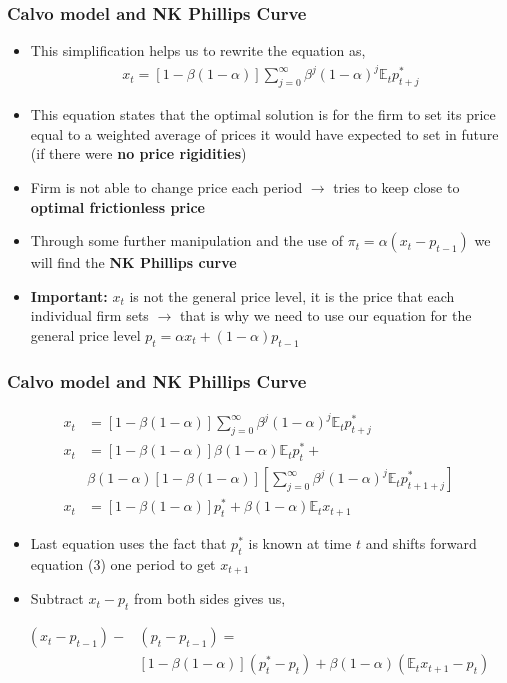\documentclass[10pt, xcolor=x11names, table]{beamer}
\begin{document}
\begin{frame}
\frametitle{Calvo model and NK Phillips Curve}
\small
\begin{itemize}
\item This simplification helps us to rewrite the equation as,
\begin{align*}
  x_{t} = [1-\beta(1-\alpha)]\sum_{j=0}^{\infty}\beta^{j}(1-\alpha)^{j}\mathbb{E}_{t}p^{*}_{t+j}
\end{align*}
\item This equation states that the optimal solution is for the firm to set its price equal to a weighted average of prices it would have expected to set in future (if there were \textbf{no price rigidities})
\item Firm is not able to change price each period $\rightarrow$ tries to keep close to \textbf{optimal frictionless price}
\item Through some further manipulation and the use of $\pi_{t} = \alpha(x_{t} - p_{t-1})$ we will find the \textbf{NK Phillips curve}
\item \textbf{Important:} $x_{t}$ is not the general price level, it is the price that each individual firm sets $\rightarrow$ that is why we need to use our equation for the general price level $p_{t} = \alpha{x_{t}} + (1-\alpha)p_{t-1}$
\end{itemize}
\end{frame}


\begin{frame}
\frametitle{Calvo model and NK Phillips Curve}
\begin{align}
x_{t} &= [1-\beta(1-\alpha)]\sum_{j=0}^{\infty}\beta^{j}(1-\alpha)^{j}\mathbb{E}_{t}p^{*}_{t+j} \\
x_{t} &= [1-\beta(1-\alpha)]\beta(1-\alpha)\mathbb{E}_{t}p^{*}_{t} + \nonumber\\ &\beta(1-\alpha)[1-\beta(1-\alpha)]\left[\sum_{j=0}^{\infty}\beta^{j}(1-\alpha)^{j}\mathbb{E}_{t}p^{*}_{t+1+j}\right] \\
x_{t} &= [1-\beta(1-\alpha)]p^{*}_{t} + \beta(1-\alpha)\mathbb{E}_{t}x_{t+1}
\end{align}
\begin{itemize}
  \item Last equation uses the fact that $p_{t}^{*}$ is known at time $t$ and shifts forward equation (3) one period to get $x_{t+1}$
  \item Subtract $x_{t} - p_{t}$ from both sides gives us,
\end{itemize}
\begin{align*}
(x_{t} - p_{t-1}) - &(p_{t} - p_{t-1}) =  \\
&[1-\beta(1-\alpha)](p^{*}_{t} - p_{t}) + \beta(1-\alpha)(\mathbb{E}_{t}x_{t+1} - p_{t})
\end{align*}
\end{frame}
\end{document}
